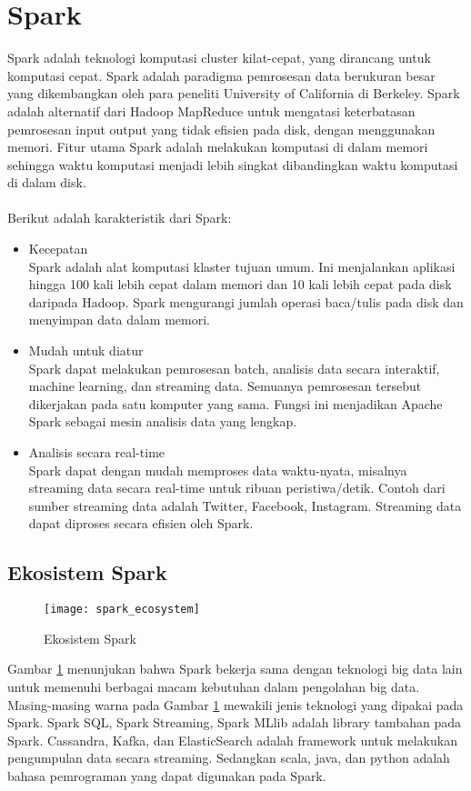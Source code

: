 \section{Spark} 
Spark adalah teknologi komputasi cluster kilat-cepat, yang dirancang untuk komputasi cepat. Spark adalah paradigma pemrosesan data berukuran besar yang dikembangkan oleh para peneliti University of California di Berkeley. Spark adalah alternatif dari Hadoop MapReduce untuk mengatasi keterbatasan pemrosesan input output yang tidak efisien pada disk, dengan menggunakan memori. Fitur utama Spark adalah melakukan komputasi di dalam memori sehingga waktu komputasi menjadi lebih singkat dibandingkan waktu komputasi di dalam disk.
\\\\
Berikut adalah karakteristik dari Spark:
\begin{itemize}
\item Kecepatan\\
Spark adalah alat komputasi klaster tujuan umum. Ini menjalankan aplikasi hingga 100 kali lebih cepat dalam memori dan 10 kali lebih cepat pada disk daripada Hadoop. Spark mengurangi jumlah operasi baca/tulis pada disk dan menyimpan data dalam memori.


\item Mudah untuk diatur\\	
Spark dapat melakukan pemrosesan batch, analisis data secara interaktif, machine learning, dan streaming data. Semuanya pemrosesan tersebut dikerjakan pada satu komputer yang sama. Fungsi ini menjadikan Apache Spark sebagai mesin analisis data yang lengkap. 


\item Analisis secara real-time\\
Spark dapat dengan mudah memproses data waktu-nyata, misalnya streaming data secara real-time untuk ribuan peristiwa/detik. Contoh dari sumber streaming data adalah Twitter, Facebook, Instagram. Streaming data dapat diproses secara efisien oleh Spark.
\end{itemize}

\subsection{Ekosistem Spark}
\begin{figure}[H]
	\centering
	\texttt{[image: spark\_ecosystem]}
	\caption{Ekosistem Spark}
	\label{fig:spark_ecosystem}
\end{figure}
Gambar \ref{fig:spark_ecosystem} menunjukan bahwa Spark bekerja sama dengan teknologi big data lain untuk memenuhi berbagai macam kebutuhan dalam pengolahan big data. Masing-masing warna pada Gambar \ref{fig:spark_ecosystem} mewakili jenis teknologi yang dipakai pada Spark. Spark SQL, Spark Streaming, Spark MLlib adalah library tambahan pada Spark. Cassandra, Kafka, dan ElasticSearch adalah framework untuk melakukan pengumpulan data secara streaming. Sedangkan scala, java, dan python adalah bahasa pemrograman yang dapat digunakan pada Spark.

